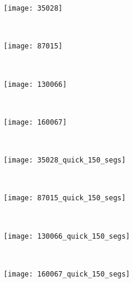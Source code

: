 \begin{figure}[!ht]
    \centering
    \begin{subfigure}[t]{\textwidth+20pt\relax}
    	\texttt{[image: 35028]} 
    \end{subfigure}      
    ~ %
    \begin{subfigure}[b]{0.2\textwidth}
        \texttt{[image: 87015]}
    \end{subfigure}
    ~ %
    \begin{subfigure}[b]{0.2\textwidth}
        \texttt{[image: 130066]}
    \end{subfigure}
    ~ %
    \begin{subfigure}[b]{0.2\textwidth}
        \texttt{[image: 160067]}
    \end{subfigure} \\[2ex]       
    
    \begin{subfigure}[t]{\textwidth+20pt\relax}
    	\texttt{[image: 35028\_quick\_150\_segs]} 
    \end{subfigure}      
    ~ %
    \begin{subfigure}[b]{0.2\textwidth}
        \texttt{[image: 87015\_quick\_150\_segs]}
    \end{subfigure}
    ~ %
    \begin{subfigure}[b]{0.2\textwidth}
        \texttt{[image: 130066\_quick\_150\_segs]}
    \end{subfigure}
    ~ %
    \begin{subfigure}[b]{0.2\textwidth}
        \texttt{[image: 160067\_quick\_150\_segs]}
    \end{subfigure} \\ [2ex]
    

\end{figure}
